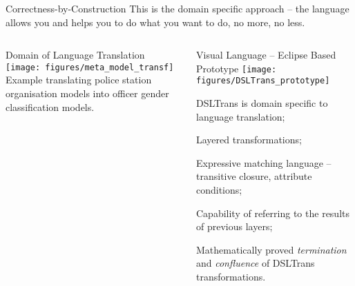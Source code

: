 \documentclass[final,hyperref={pdfpagelabels=false}]{beamer}
\begin{document}
\begin{frame}{}
\begin{columns}[t]
\begin{column}{.485\linewidth}
\begin{block}{Correctness-by-Construction}
        This is the domain specific approach -- the language allows you and
        helps you to do what you want to do, no more, no less.\vspace{1.45cm}
        \end{block}
      \end{column}

    \end{columns}

    \vspace{0.5cm}
    
    \begin{columns}[t]

      \begin{column}{.485\linewidth}
        \begin{block}{Domain of Language Translation}
		  \texttt{[image: figures/meta\_model\_transf]}\\
		  \vspace{.7cm}  
		  {\footnotesize		  
 		  Example translating police station organisation models into officer gender
 		  classification models.}
        \end{block}
      \end{column}

       \begin{column}{.485\linewidth}
        \begin{block}{Visual Language -- Eclipse Based Prototype}
		  \texttt{[image: figures/DSLTrans\_prototype]}
		  \vspace{.01cm}  
		  \begin{itemize}
		  {\footnotesize
		    \item DSLTrans is domain specific to language translation;
		    \item Layered transformations;
		    \item Expressive matching language -- transitive closure, attribute
		    conditions;
		    \item Capability of referring to the results of previous layers;
		    \item Mathematically proved \emph{termination} and
		    \emph{confluence} of DSLTrans transformations.}
		  \end{itemize}
        \end{block}
      \end{column}

    \end{columns}

   \vspace{0.5cm}


\end{frame}
\end{document}
